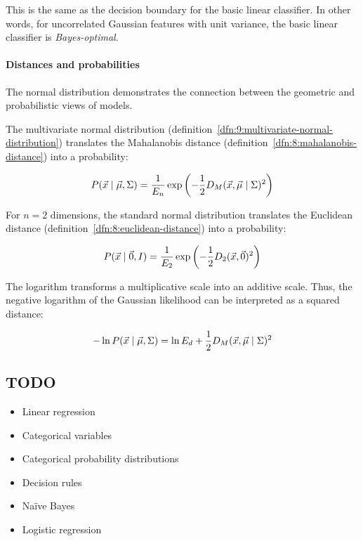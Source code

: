 This is the same as the decision boundary for the basic linear classifier.
In other words, for uncorrelated Gaussian features with unit variance, the basic
linear classifier is \textit{Bayes-optimal}.

\paragraph{Distances and probabilities}

The normal distribution demonstrates the connection between the geometric and
probabilistic views of models.

The multivariate normal distribution (definition~\ref{dfn:9:multivariate-normal-distribution})
translates the Mahalanobis distance (definition~\ref{dfn:8:mahalanobis-distance})
into a probability:

\begin{equation}
  P(\vec{x} \mid \vec{\mu}, \Sigma)
  = \frac{1}{E_n} \exp\left( - \frac{1}{2} D_M (\vec{x}, \vec{\mu} \mid \Sigma)^2 \right)
\end{equation}

For $n = 2$ dimensions, the standard normal distribution translates the
Euclidean distance (definition~\ref{dfn:8:euclidean-distance}) into a
probability:

\begin{equation}
  P(\vec{x} \mid \vec{0}, I)
  = \frac{1}{E_2} \exp\left( - \frac{1}{2} D_2 (\vec{x}, \vec{0})^2 \right)
\end{equation}

The logarithm transforms a multiplicative scale into an additive scale.
Thus, the negative logarithm of the Gaussian likelihood can be interpreted as a
squared distance:

\begin{equation}
  - \ln P(\vec{x} \mid \vec{\mu}, \Sigma)
  = \ln E_d + \frac{1}{2} D_M (\vec{x}, \vec{\mu} \mid \Sigma)^2
\end{equation}

\subsection{TODO}

\begin{itemize}
  \item Linear regression
  \item Categorical variables
  \item Categorical probability distributions
  \item Decision rules
  \item Naïve Bayes
  \item Logistic regression
\end{itemize}